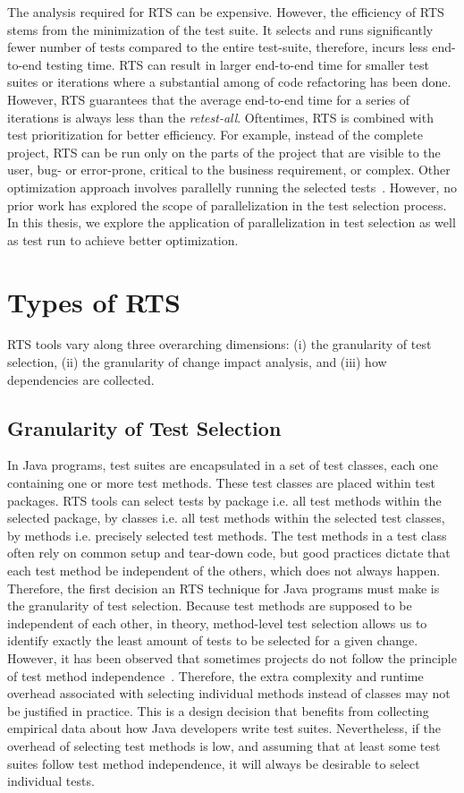 The analysis required for RTS can be expensive. However, the efficiency of RTS stems from the minimization of the test suite. It selects and runs significantly fewer number of tests compared to the entire test-suite, therefore, incurs less end-to-end testing time. RTS can result in larger end-to-end time for smaller test suites or iterations where a substantial among of code refactoring has been done. However, RTS guarantees that the average end-to-end time for a series of iterations is always less than the \textit{retest-all}. Oftentimes, RTS is combined with test prioritization for better efficiency. For example, instead of the complete project, RTS can be run only on the parts of the project that are visible to the user, bug- or error-prone, critical to the business requirement, or complex. Other optimization approach involves parallelly running the selected tests~\cite{candido2017test}. However, no prior work has explored the scope of parallelization in the test selection process. In this thesis, we explore the application of parallelization in test selection as well as test run to achieve better optimization. 

\section{Types of RTS}

RTS tools vary along three overarching dimensions: (i) the granularity of test selection, (ii) the granularity of change impact analysis, and (iii) how dependencies are collected.

\subsection{Granularity of Test Selection}

In Java programs, test suites are encapsulated in a set of test classes, each one containing one or more test methods. These test classes are placed within test packages. RTS tools can select tests by package i.e. all test methods within the selected package, by classes i.e. all test methods within the selected test classes, by methods i.e. precisely selected test methods. The test methods in a test class often rely on common setup and tear-down code, but good practices dictate that each test method be independent of the others, which does not always happen. Therefore, the first decision an RTS technique for Java programs must make is the granularity of test selection. Because test methods are supposed to be independent of each other, in theory, method-level test selection allows us to identify exactly the least amount of tests to be selected for a given change. However, it has been observed that sometimes projects do not follow the principle of test method independence~\cite{b18}. Therefore, the extra complexity and runtime overhead associated with selecting individual methods instead of classes may not be justified in practice. This is a design decision that benefits from collecting empirical data about how Java developers write test suites. Nevertheless, if the overhead of selecting test methods is low, and assuming that at least some test suites follow test method independence, it will always be desirable to select individual tests.

